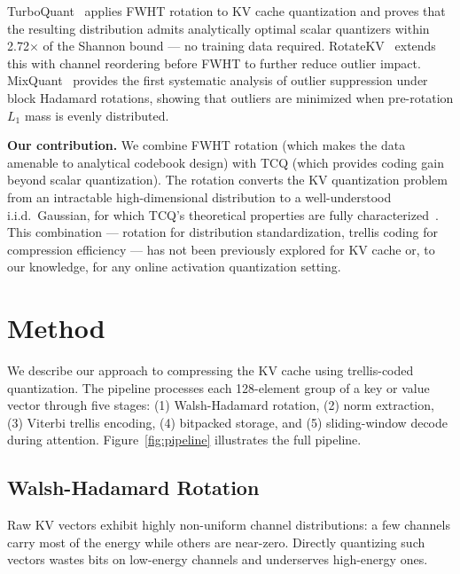 \documentclass{article}
\begin{document}
TurboQuant~\cite{turboquant2026} applies FWHT rotation to KV cache
quantization and proves that the resulting distribution admits analytically
optimal scalar quantizers within 2.72$\times$ of the Shannon bound — no
training data required. RotateKV~\cite{rotatekv2025} extends this with
channel reordering before FWHT to further reduce outlier impact.
MixQuant~\cite{mixquant2026} provides the first systematic analysis of
outlier suppression under block Hadamard rotations, showing that outliers are
minimized when pre-rotation $L_1$ mass is evenly distributed.

\textbf{Our contribution.} We combine FWHT rotation (which makes the data
amenable to analytical codebook design) with TCQ (which provides coding gain
beyond scalar quantization). The rotation converts the KV quantization problem
from an intractable high-dimensional distribution to a well-understood i.i.d.\
Gaussian, for which TCQ's theoretical properties are fully
characterized~\cite{marcellin1990tcq}. This combination — rotation for
distribution standardization, trellis coding for compression efficiency — has
not been previously explored for KV cache or, to our knowledge, for any
online activation quantization setting.

\section{Method}
\label{sec:method}

We describe our approach to compressing the KV cache using trellis-coded
quantization. The pipeline processes each 128-element group of a key or value
vector through five stages: (1) Walsh-Hadamard rotation, (2) norm extraction,
(3) Viterbi trellis encoding, (4) bitpacked storage, and (5) sliding-window
decode during attention. Figure~\ref{fig:pipeline} illustrates the full
pipeline.


\subsection{Walsh-Hadamard Rotation}
\label{sec:rotation}

Raw KV vectors exhibit highly non-uniform channel distributions: a few channels
carry most of the energy while others are near-zero. Directly quantizing such
vectors wastes bits on low-energy channels and underserves high-energy ones.
\end{document}
